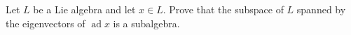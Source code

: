 Let $L$ be a Lie algebra and let $x \in L$. Prove that the subspace of $L$ spanned by the eigenvectors of $\operatorname{ad} x$ is a subalgebra.

